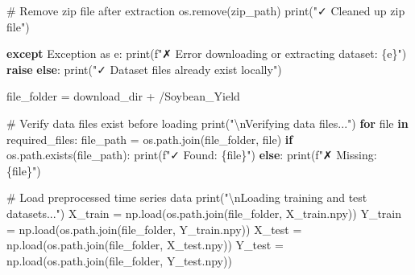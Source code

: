 \documentclass[
  letterpaper,
  DIV=11,
  numbers=noendperiod]{scrreprt}
\newenvironment{Shaded}{\begin{snugshade}}{\end{snugshade}}
\newcommand{\BuiltInTok}[1]{\textcolor[rgb]{0.00,0.23,0.31}{#1}}
\newcommand{\CharTok}[1]{\textcolor[rgb]{0.13,0.47,0.30}{#1}}
\newcommand{\CommentTok}[1]{\textcolor[rgb]{0.37,0.37,0.37}{#1}}
\newcommand{\ControlFlowTok}[1]{\textcolor[rgb]{0.00,0.23,0.31}{\textbf{#1}}}
\newcommand{\ImportTok}[1]{\textcolor[rgb]{0.00,0.46,0.62}{#1}}
\newcommand{\KeywordTok}[1]{\textcolor[rgb]{0.00,0.23,0.31}{\textbf{#1}}}
\newcommand{\NormalTok}[1]{\textcolor[rgb]{0.00,0.23,0.31}{#1}}
\newcommand{\OperatorTok}[1]{\textcolor[rgb]{0.37,0.37,0.37}{#1}}
\newcommand{\PreprocessorTok}[1]{\textcolor[rgb]{0.68,0.00,0.00}{#1}}
\newcommand{\SpecialCharTok}[1]{\textcolor[rgb]{0.37,0.37,0.37}{#1}}
\newcommand{\SpecialStringTok}[1]{\textcolor[rgb]{0.13,0.47,0.30}{#1}}
\newcommand{\StringTok}[1]{\textcolor[rgb]{0.13,0.47,0.30}{#1}}
\begin{document}
\begin{Shaded}
\begin{Highlighting}[]
        \CommentTok{\# Remove zip file after extraction}
\NormalTok{        os.remove(zip\_path)}
        \BuiltInTok{print}\NormalTok{(}\StringTok{"✓ Cleaned up zip file"}\NormalTok{)}
        
    \ControlFlowTok{except} \PreprocessorTok{Exception} \ImportTok{as}\NormalTok{ e:}
        \BuiltInTok{print}\NormalTok{(}\SpecialStringTok{f"✗ Error downloading or extracting dataset: }\SpecialCharTok{\{}\NormalTok{e}\SpecialCharTok{\}}\SpecialStringTok{"}\NormalTok{)}
        \ControlFlowTok{raise}
\ControlFlowTok{else}\NormalTok{:}
    \BuiltInTok{print}\NormalTok{(}\StringTok{"✓ Dataset files already exist locally"}\NormalTok{)}

\NormalTok{file\_folder }\OperatorTok{=}\NormalTok{ download\_dir }\OperatorTok{+} \StringTok{\textquotesingle{}/Soybean\_Yield\textquotesingle{}}

\CommentTok{\# Verify data files exist before loading}
\BuiltInTok{print}\NormalTok{(}\StringTok{"}\CharTok{\textbackslash{}n}\StringTok{Verifying data files..."}\NormalTok{)}
\ControlFlowTok{for} \BuiltInTok{file} \KeywordTok{in}\NormalTok{ required\_files:}
\NormalTok{    file\_path }\OperatorTok{=}\NormalTok{ os.path.join(file\_folder, }\BuiltInTok{file}\NormalTok{)}
    \ControlFlowTok{if}\NormalTok{ os.path.exists(file\_path):}
        \BuiltInTok{print}\NormalTok{(}\SpecialStringTok{f"✓ Found: }\SpecialCharTok{\{}\BuiltInTok{file}\SpecialCharTok{\}}\SpecialStringTok{"}\NormalTok{)}
    \ControlFlowTok{else}\NormalTok{:}
        \BuiltInTok{print}\NormalTok{(}\SpecialStringTok{f"✗ Missing: }\SpecialCharTok{\{}\BuiltInTok{file}\SpecialCharTok{\}}\SpecialStringTok{"}\NormalTok{)}

\CommentTok{\# Load preprocessed time series data}
\BuiltInTok{print}\NormalTok{(}\StringTok{"}\CharTok{\textbackslash{}n}\StringTok{Loading training and test datasets..."}\NormalTok{)}
\NormalTok{X\_train }\OperatorTok{=}\NormalTok{ np.load(os.path.join(file\_folder, }\StringTok{\textquotesingle{}X\_train.npy\textquotesingle{}}\NormalTok{))}
\NormalTok{Y\_train }\OperatorTok{=}\NormalTok{ np.load(os.path.join(file\_folder, }\StringTok{\textquotesingle{}Y\_train.npy\textquotesingle{}}\NormalTok{))}
\NormalTok{X\_test }\OperatorTok{=}\NormalTok{ np.load(os.path.join(file\_folder, }\StringTok{\textquotesingle{}X\_test.npy\textquotesingle{}}\NormalTok{))}
\NormalTok{Y\_test }\OperatorTok{=}\NormalTok{ np.load(os.path.join(file\_folder, }\StringTok{\textquotesingle{}Y\_test.npy\textquotesingle{}}\NormalTok{))}


\end{Highlighting}
\end{Shaded}
\end{document}
